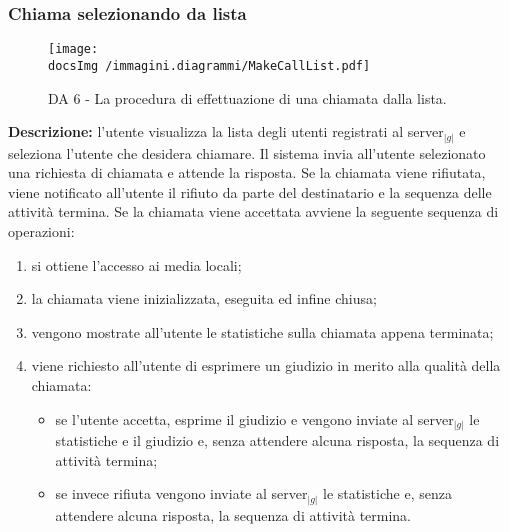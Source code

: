 		
		
		\subsubsection{Chiama selezionando da lista}
		\begin{center}
			\begin{figure}[htbp]
				\centering
				\texttt{[image: \\docsImg /immagini.diagrammi/MakeCallList.pdf]}
			\caption{DA 6 - La procedura di effettuazione di una chiamata dalla lista.}	
			\end{figure}
		\end{center}		
		\noindent \textbf{Descrizione: }l'utente visualizza la lista degli utenti registrati al server$_{|g|}$ e seleziona l'utente che desidera chiamare.
		Il sistema invia all'utente selezionato una richiesta di chiamata e attende la risposta.
		Se la chiamata viene rifiutata, viene notificato all'utente il rifiuto da parte del destinatario e la sequenza delle attività termina.
		Se la chiamata viene accettata avviene la seguente sequenza di operazioni:
		\begin{enumerate}
			\item si ottiene l'accesso ai media locali;
			\item la chiamata viene inizializzata, eseguita ed infine chiusa;
			\item vengono mostrate all'utente le statistiche sulla chiamata appena terminata;
			\item viene richiesto all'utente di esprimere un giudizio in merito alla qualità della chiamata:
			\begin{itemize}
			\item se l'utente accetta, esprime il giudizio e vengono inviate al server$_{|g|}$ le statistiche e il giudizio e, senza attendere alcuna risposta, la sequenza di attività termina;
			\item se invece rifiuta vengono inviate al server$_{|g|}$ le statistiche e, senza attendere alcuna risposta, la sequenza di attività termina.
			\end{itemize}
		\end{enumerate}	

		
		
		
